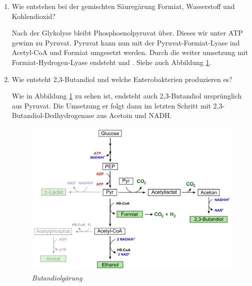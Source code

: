 \begin{enumerate}
		\emph{E. coli} verwendet einen Gärungstyp bei dem viel Säure und kein 2,3-Butandiol endsteht.
		Das Verhältnis von sauren Gärprodukten zu neutralen ist hier 4:1.
		Beim  zweiten Gärungstypen beträgt das Verhältnis 1:6.
		\emph{Enterobacter} und \emph{Klebsiella} beispielsweise,
		erzeigen hingegen wenig Säure und 2,3-Butandiol.

	\item Wie entstehen bei der gemischten Säuregärung Formiat, Wasserstoff und Kohlendioxid?
		
		Nach der Glykolyse bleibt Phosphoenolpyruvat über.
		Dieses wir unter ATP gewinn zu Pyruvat.
		Pyruvat kann nun mit der Pyruvat-Formiat-Lyase ind Acetyl-CoA und Formiat umgesetzt werden.
		Durch die weiter umsetzung mit Formiat-Hydrogen-Lyase endsteht  und .
		Siehe auch Abbildung \ref{fig:butandiolgaerung}.

	\item Wie entsteht 2,3-Butandiol und welche Enterobakterien produzieren es?

		Wie in Abbildung \ref{fig:butandiolgaerung} zu sehen ist,
		endsteht auch 2,3-Butandiol ursprünglich aus Pyruvat.
		Die Umsetzung er folgt dann im letzten Schritt mit 2,3-Butandiol-Dedhydrogenase
		aus Acetoin und NADH.
		
		\begin{figure}[ht]
		\leavevmode
		\begin{center}
		\includegraphics[scale=0.32]{./pictures/butandiolgaerung_1000}
		\end{center}
		\caption{\slshape{Butandiolgärung}}
		\label{fig:butandiolgaerung}
		\end{figure}


\end{enumerate}
